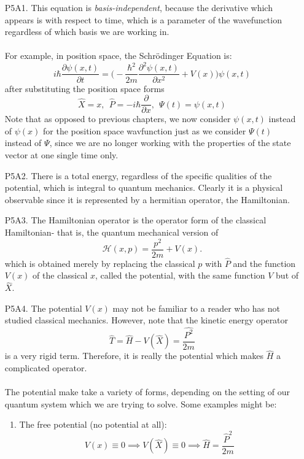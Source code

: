 \begin{enumerate}
    \item [P5A1.] This equation is \textit{basis-independent}, because the derivative which appears is with respect to time, which is a parameter of the wavefunction regardless of which basis we are working in.
    \\\\
    For example, in position space, the Schr\"{o}dinger Equation is:
    $$
    i\hbar\frac{\partial \psi(x,t)}{\partial t}= \biggl(-\frac{\hbar^2}{2m}\frac{\partial^2 \psi(x,t)}{\partial x^2}+ V(x)\biggr)\psi(x,t)
    $$
    after substituting the position space forms
    $$
    \hat{X}=x, \:\: \hat{P}=-i\hbar\frac{\partial}{\partial x}, \:\: \Psi(t) = \psi(x,t)
    $$
    Note that as opposed to previous chapters, we now consider $\psi(x,t)$ instead of $\psi(x)$ for the position space wavfunction just as we consider $\Psi(t)$ instead of $\Psi$, since we are no longer working with the properties of the state vector at one single time only.
    \item[P5A2.] There is a total energy, regardless of the specific qualities of the potential, which is integral to quantum mechanics. Clearly it is a physical observable since it is represented by a hermitian operator, the Hamiltonian.
    \item[P5A3.] The Hamiltonian operator is the operator form of the classical Hamiltonian- that is, the quantum mechanical version of 
    $$
    \mathscr{H}(x,p)=\frac{p^2}{2m}+V(x).
    $$
    which is obtained merely by replacing the classical $p$ with $\hat{P}$ and the function $V(x)$ of the classical $x$, called the potential, with the same function $V$ but of $\hat{X}$.
    \item[P5A4.] The potential $V(x)$ may not be familiar to a reader who has not studied classical mechanics. However, note that the kinetic energy operator $$\hat{T}= \hat{H}-V(\hat{X})= \frac{\hat{P^2}}{2m}$$ is a very rigid term. Therefore, it is really the potential which makes $\hat{H}$ a complicated operator.
    \\\\
    The potential make take a variety of forms, depending on the setting of our quantum system which we are trying to solve. Some examples might be:
    \begin{enumerate}
        \item The free potential (no potential at all):
        $$
        V(x)\equiv 0 \implies V(\hat{X}) \equiv 0 \implies \hat{H} = \frac{\hat{P}^{2}}{2m}
$$
\end{enumerate}
\end{enumerate}
